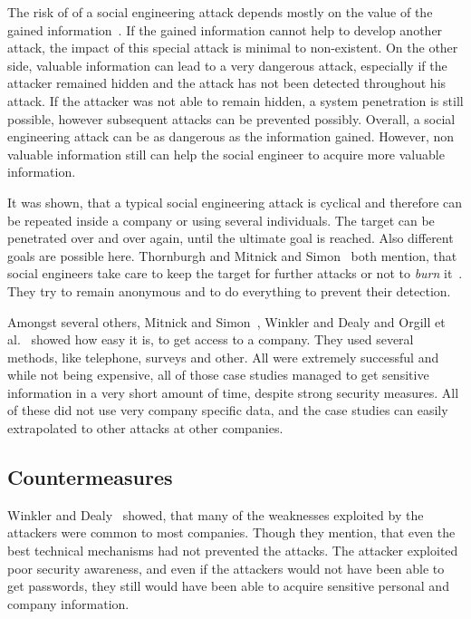 The risk of of a social engineering attack depends mostly on the value of the
gained information~\cite{thornburgh2004}. If the gained information cannot help
to develop another attack, the impact of this special attack is minimal to
non-existent. On the other side, valuable information can lead to a very
dangerous attack, especially if the attacker remained hidden and the attack has
not been detected throughout his attack. If the attacker was not able to remain
hidden, a system penetration is still possible, however subsequent attacks can
be prevented possibly. Overall, a social engineering attack can be as dangerous
as the information gained. However, non valuable information still can help the
social engineer to acquire more valuable information.

It was shown, that a typical social engineering attack is cyclical and
therefore can be repeated inside a company or using several individuals. The
target can be penetrated over and over again, until the ultimate goal is
reached. Also different goals are possible here. Thornburgh
\cite{thornburgh2004} and Mitnick and Simon~\cite{mitnick2003} both mention,
that social engineers take care to keep the target for further attacks or not
to \textit{burn} it~\cite{thornburgh2004}. They try to remain anonymous and to
do everything to prevent their detection.

Amongst several others, Mitnick and Simon~\cite{mitnick2003}, Winkler and Dealy
\cite{winkler1995} and Orgill et al.~\cite{orgill2004} showed how easy it is,
to get access to a company. They used several methods, like telephone, surveys
and other. All were extremely successful and while not being expensive, all of
those case studies managed to get sensitive information in a very short amount
of time, despite strong security measures. All of these did not use very
company specific data, and the case studies can easily extrapolated to other
attacks at other companies.

\subsection{Countermeasures}

Winkler and Dealy~\cite{winkler1995} showed, that many of the weaknesses
exploited by the attackers were common to most companies. Though they mention,
that even the best technical mechanisms had not prevented the attacks. The
attacker exploited poor security awareness, and even if the attackers would not
have been able to get passwords, they still would have been able to acquire
sensitive personal and company information.

